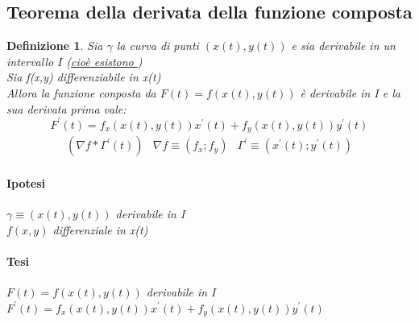 \documentclass{book}
\newtheorem{defi}{Definizione}
\begin{document}
\subsection{Teorema della derivata della funzione composta}
\begin{defi}
	Sia $\gamma$ la curva di punti $(x(t),y(t))$ e sia derivabile in un
	intervallo $I$ (\underline{cioè esistono })\\
	Sia f(x,y) differenziabile in x(t)\\
	Allora la funzione conposta da $F(t)=f(x(t),y(t))$ è derivabile in I e la
	sua derivata prima vale:
	\begin{equation}
		F^\prime (t)=f_x(x(t),y(t))x^\prime(t)+f_y(x(t),y(t))y^\prime(t)
	\end{equation}
	\begin{equation*}
		\begin{matrix}
			(\nabla f *\Gamma^\prime (t)) & \nabla f \equiv (f_x;f_y) &
			\Gamma^\prime \equiv(x^\prime (t); y^\prime (t))
		\end{matrix}
	\end{equation*}
	\begin{multicols}{2}
		\paragraph{Ipotesi}
			$\gamma \equiv (x(t),y(t))$ derivabile in I\\
			$f(x,y)$ differenziale in x(t)
		\paragraph{Tesi}
		$F(t)=f(x(t),y(t))$ derivabile in I\\
		$F^\prime(t)=f_x(x(t),y(t))x^\prime(t)+f_y(x(t),y(t))y^\prime (t)$
	\end{multicols}
\end{defi}
\end{document}
